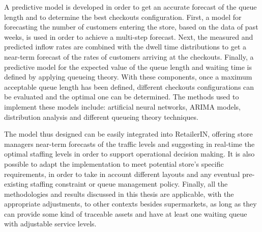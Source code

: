 A predictive model is developed in order to get an accurate forecast of the queue length and to determine the best checkouts configuration. First, a model for forecasting the number of customers entering the store, based on the data of past weeks, is used in order to achieve a multi-step forecast. Next, the measured and predicted inflow rates are combined with the dwell time distributions to get a near-term forecast of the rates of customers arriving at the checkouts. Finally, a predictive model for the expected value of the queue length and waiting time is defined by applying queueing theory. With these components, once a maximum acceptable queue length has been defined, different checkouts configurations can be evaluated and the optimal one can be determined. The methods used to implement these models include: artificial neural networks, ARIMA models, distribution analysis and different queueing theory techniques.

The model thus designed can be easily integrated into RetailerIN, offering store managers near-term forecasts of the traffic levels and suggesting in real-time the optimal staffing levels in order to support operational decision making. It is also possible to adapt the implementation to meet potential store’s specific requirements, in order to take in account different layouts and any eventual pre-existing staffing constraint or queue management policy. Finally, all the methodologies and results discussed in this thesis are applicable, with the appropriate adjustments, to other contexts besides supermarkets, as long as they can provide some kind of traceable assets and have at least one waiting queue with adjustable service levels.

\clearpage